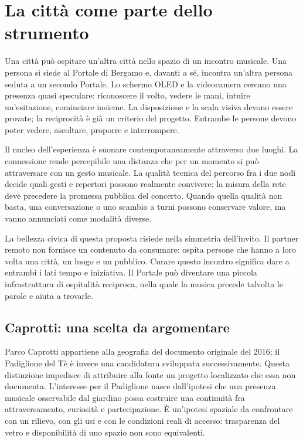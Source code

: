 \chapter{La città come parte dello strumento}\label{sec:city}

Una città può ospitare un'altra città nello spazio di un incontro musicale.
Una persona si siede al Portale di Bergamo e, davanti a sé, incontra un'altra
persona seduta a un secondo Portale. Lo schermo OLED e la videocamera
cercano una presenza quasi speculare: riconoscere il volto, vedere le mani,
intuire un'esitazione, cominciare insieme. La disposizione e la scala
visiva devono essere provate; la reciprocità è già un criterio del progetto.
Entrambe le persone devono poter vedere, ascoltare, proporre e interrompere.

Il nucleo dell'esperienza è suonare contemporaneamente attraverso due
luoghi. La connessione rende percepibile una distanza che per un momento
si può attraversare con un gesto musicale. La qualità tecnica del percorso
fra i due nodi decide quali gesti e repertori possono realmente convivere:
la misura della rete deve precedere la promessa pubblica del concerto.
Quando quella qualità non basta, una conversazione o uno scambio a turni
possono conservare valore, ma vanno annunciati come modalità diverse.

La bellezza civica di questa proposta risiede nella simmetria dell'invito.
Il partner remoto non fornisce un contenuto da consumare: ospita persone
che hanno a loro volta una città, un luogo e un pubblico. Curare questo
incontro significa dare a entrambi i lati tempo e iniziativa. Il Portale
può diventare una piccola infrastruttura di ospitalità reciproca, nella
quale la musica precede talvolta le parole e aiuta a trovarle.

\section{Caprotti: una scelta da argomentare}
Parco Caprotti appartiene alla geografia del documento originale del 2016;
il Padiglione del Tè è invece una candidatura sviluppata successivamente.
Questa distinzione impedisce di attribuire alla fonte un progetto localizzato
che essa non documenta. L'interesse per il Padiglione nasce dall'ipotesi
che una presenza musicale osservabile dal giardino possa costruire una
continuità fra attraversamento, curiosità e partecipazione. È un'ipotesi
spaziale da confrontare con un rilievo, con gli usi e con le condizioni reali
di accesso: trasparenza del vetro e disponibilità di uno spazio non sono
equivalenti.


